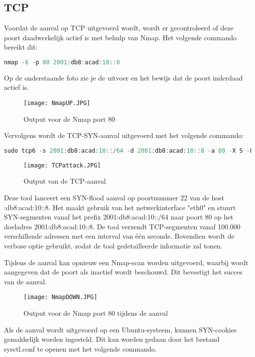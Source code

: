 \subsection{TCP}
Voordat de aanval op TCP uitgevoerd wordt, wordt er gecontroleerd of deze poort daadwerkelijk actief is met behulp van Nmap. Het volgende commando bereikt dit: 
\begin{lstlisting}[language=PowerShell,style=PowerShellStyle]
     nmap -6 -p 80 2001:db8:acad:10::8 
\end{lstlisting}
 Op de onderstaande foto zie je de uitvoer en het bewijs dat de poort inderdaad actief is.
 \begin{figure}[H]
     \texttt{[image: NmapUP.JPG]}
     \caption{
         Output voor de Nmap port 80 }
         \label{fig:Nmap1}
 \end{figure}  
 
 Vervolgens wordt de TCP-SYN-aanval uitgevoerd met het volgende commando:
\begin{lstlisting}[language=PowerShell,style=PowerShellStyle]
     sudo tcp6 -s 2001:db8:acad:10::/64 -d 2001:db8:acad:10::8 -a 80 -X S -F 100000 -l -z 1 -v
\end{lstlisting}
 \begin{figure}[H]
    \texttt{[image: TCPattack.JPG]}
    \caption{
        Output van de TCP-aanval }
        \label{fig:TCPattack}
\end{figure}  

Deze tool lanceert een SYN-flood aanval op poortnummer 22 van de host :db8:acad:10::8. Het maakt gebruik van het netwerkinterface "eth0" en stuurt SYN-segmenten vanaf het prefix 2001:db8:acad:10::/64 naar poort 80 op het doeladres 2001:db8:acad:10::8. De tool verzendt TCP-segmenten vanaf 100.000 verschillende adressen met een interval van één seconde. Bovendien wordt de verbose optie gebruikt, zodat de tool gedetailleerde informatie zal tonen.

Tijdens de aanval kan opnieuw een Nmap-scan worden uitgevoerd, waarbij wordt aangegeven dat de poort als inactief wordt beschouwd. Dit bevestigt het succes van de aanval.

 \begin{figure}[H]
    \texttt{[image: NmapDOWN.JPG]}
    \caption{
        Output voor de Nmap port 80 tijdens de aanval }
        \label{fig:Nmap2}
\end{figure}  

Als de aanval wordt uitgevoerd op een Ubuntu-systeem, kunnen SYN-cookies gemakkelijk worden ingesteld. Dit kan worden gedaan door het bestand sysctl.conf te openen met het volgende commando.

